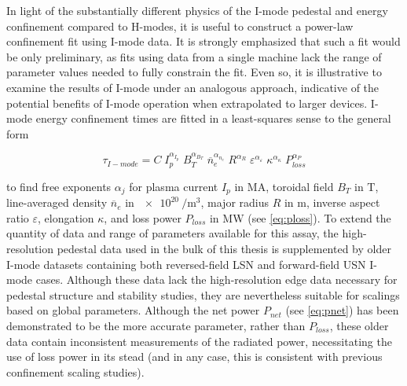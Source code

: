 In light of the substantially different physics of the I-mode pedestal and energy confinement compared to H-modes, it is useful to construct a power-law confinement fit using I-mode data.  It is strongly emphasized that such a fit would be only preliminary, as fits using data from a single machine lack the range of parameter values needed to fully constrain the fit.  Even so, it is illustrative to examine the results of I-mode under an analogous approach, indicative of the potential benefits of I-mode operation when extrapolated to larger devices.  I-mode energy confinement times are fitted in a least-squares sense to the general form

\begin{equation}\label{eq:taufit}
 \tau_{I-mode} = C \; I_p^{\alpha_{I_p}} \; B_T^{\alpha_{B_T}} \; \overline{n}_e^{\alpha_{n_e}} \; R^{\alpha_R} \; \varepsilon^{\alpha_\varepsilon} \; \kappa^{\alpha_\kappa} \; P_{loss}^{\alpha_P}
\end{equation}

\noindent to find free exponents $\alpha_j$ for plasma current $I_p$ in $\si{\mega\ampere}$, toroidal field $B_T$ in $\si{\tesla}$, line-averaged density $\overline{n}_e$ in $\SI{e20}{\per\meter\cubed}$, major radius $R$ in $\si{\meter}$, inverse aspect ratio $\varepsilon$, elongation $\kappa$, and loss power $P_{loss}$ in $\si{\mega\watt}$ (see \cref{eq:ploss}).  To extend the quantity of data and range of parameters available for this assay, the high-resolution pedestal data used in the bulk of this thesis is supplemented by older I-mode datasets containing both reversed-field LSN and forward-field USN I-mode cases.  Although these data lack the high-resolution edge data necessary for pedestal structure and stability studies, they are nevertheless suitable for scalings based on global parameters.  Although the net power $P_{net}$ (see \cref{eq:pnet}) has been demonstrated to be the more accurate parameter, rather than $P_{loss}$, these older data contain inconsistent measurements of the radiated power, necessitating the use of loss power in its stead (and in any case, this is consistent with previous confinement scaling studies).

